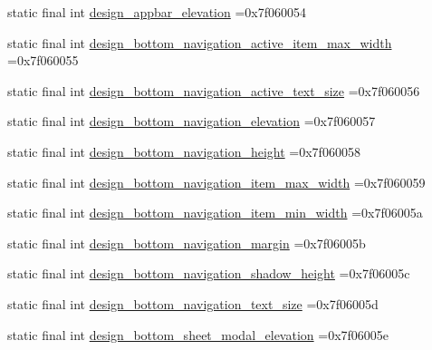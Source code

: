 \begin{DoxyCompactItemize}
\item 
static final int \mbox{\hyperlink{classbr_1_1unb_1_1cic_1_1mp_1_1marketmaster_1_1R_1_1dimen_a70e5e972cda04f32d06cc6ec2d4978b5}{design\+\_\+appbar\+\_\+elevation}} =0x7f060054
\item 
static final int \mbox{\hyperlink{classbr_1_1unb_1_1cic_1_1mp_1_1marketmaster_1_1R_1_1dimen_af74e3c455c99d605e3becfaacc6b16a6}{design\+\_\+bottom\+\_\+navigation\+\_\+active\+\_\+item\+\_\+max\+\_\+width}} =0x7f060055
\item 
static final int \mbox{\hyperlink{classbr_1_1unb_1_1cic_1_1mp_1_1marketmaster_1_1R_1_1dimen_a3c052d7d114cf79f807f57e7baf8746f}{design\+\_\+bottom\+\_\+navigation\+\_\+active\+\_\+text\+\_\+size}} =0x7f060056
\item 
static final int \mbox{\hyperlink{classbr_1_1unb_1_1cic_1_1mp_1_1marketmaster_1_1R_1_1dimen_a1d2515d92abe374186b9d8287436a412}{design\+\_\+bottom\+\_\+navigation\+\_\+elevation}} =0x7f060057
\item 
static final int \mbox{\hyperlink{classbr_1_1unb_1_1cic_1_1mp_1_1marketmaster_1_1R_1_1dimen_abfc4463a027d825861491068fcea342f}{design\+\_\+bottom\+\_\+navigation\+\_\+height}} =0x7f060058
\item 
static final int \mbox{\hyperlink{classbr_1_1unb_1_1cic_1_1mp_1_1marketmaster_1_1R_1_1dimen_a1be50e99f562380af45ddf97b0408bd1}{design\+\_\+bottom\+\_\+navigation\+\_\+item\+\_\+max\+\_\+width}} =0x7f060059
\item 
static final int \mbox{\hyperlink{classbr_1_1unb_1_1cic_1_1mp_1_1marketmaster_1_1R_1_1dimen_a07f7847fc9663c3401173093bff1ed4b}{design\+\_\+bottom\+\_\+navigation\+\_\+item\+\_\+min\+\_\+width}} =0x7f06005a
\item 
static final int \mbox{\hyperlink{classbr_1_1unb_1_1cic_1_1mp_1_1marketmaster_1_1R_1_1dimen_a7d9ccbf74dbfa14b11f22c03880d9bb4}{design\+\_\+bottom\+\_\+navigation\+\_\+margin}} =0x7f06005b
\item 
static final int \mbox{\hyperlink{classbr_1_1unb_1_1cic_1_1mp_1_1marketmaster_1_1R_1_1dimen_ac2c399db2630cfa4823295b8ed8abcea}{design\+\_\+bottom\+\_\+navigation\+\_\+shadow\+\_\+height}} =0x7f06005c
\item 
static final int \mbox{\hyperlink{classbr_1_1unb_1_1cic_1_1mp_1_1marketmaster_1_1R_1_1dimen_ae464cb0e2ccd32c23ef595781c8b550c}{design\+\_\+bottom\+\_\+navigation\+\_\+text\+\_\+size}} =0x7f06005d
\item 
static final int \mbox{\hyperlink{classbr_1_1unb_1_1cic_1_1mp_1_1marketmaster_1_1R_1_1dimen_a41419194830f062508631ecc953aa75c}{design\+\_\+bottom\+\_\+sheet\+\_\+modal\+\_\+elevation}} =0x7f06005e

\end{DoxyCompactItemize}
